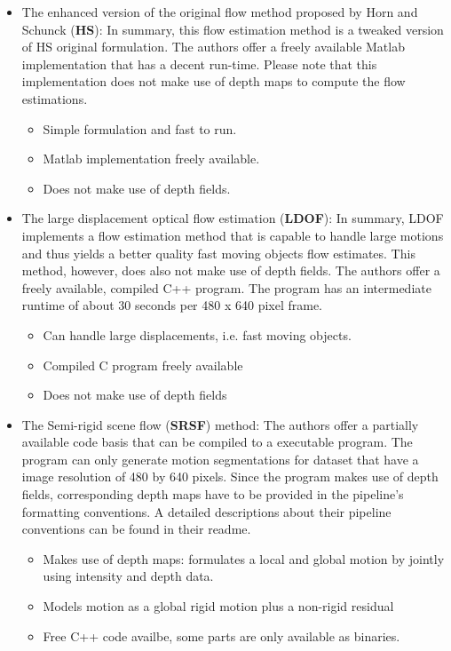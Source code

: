 \begin{itemize}
\item The enhanced version of the original flow method proposed by Horn and Schunck (\textbf{HS}): In summary, this flow estimation method is a tweaked version of HS original formulation. The authors offer a freely available Matlab implementation that has a decent run-time. Please note that this implementation does not make use of depth maps to compute the flow estimations.
	\begin{itemize}
	\item Simple formulation and fast to run.
	\item Matlab implementation freely available.
	\item Does not make use of depth fields.
	\end{itemize}
\item The large displacement optical flow estimation (\textbf{LDOF}): In summary, LDOF implements a flow estimation method that is capable to handle large motions and thus yields a better quality fast moving objects flow estimates. This method, however, does also not make use of depth fields. The authors offer a freely available, compiled C++ program. The program has an intermediate runtime of about 30 seconds per 480 x 640 pixel frame.
	\begin{itemize}
	\item Can handle large displacements, i.e. fast moving objects.
	\item Compiled C program freely available
	\item Does not make use of depth fields
	\end{itemize}
\item The Semi-rigid scene flow (\textbf{SRSF}) method: The authors offer a partially available code basis that can be compiled to a executable program. The program can only generate motion segmentations for dataset that have a image resolution of 480 by 640 pixels. Since the program makes use of depth fields, corresponding depth maps have to be provided in the pipeline's formatting conventions. A detailed descriptions about their pipeline conventions can be found in their readme. 
	\begin{itemize}
	\item Makes use of depth maps: formulates a local and global motion by jointly using intensity and depth data.
	\item Models motion as a global rigid motion plus a non-rigid residual
	\item Free C++ code availbe, some parts are only available as binaries.

\end{itemize}
\end{itemize}
